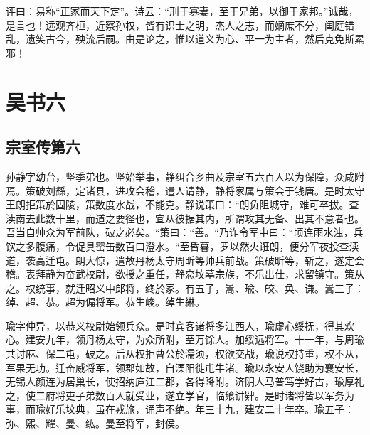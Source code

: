 \documentclass[12pt,UTF8]{ctexbook}
\begin{document}
评曰：易称“正家而天下定”。诗云：“刑于寡妻，至于兄弟，以御于家邦。”诚哉，是言也！远观齐桓，近察孙权，皆有识士之明，杰人之志，而嫡庶不分，闺庭错乱，遗笑古今，殃流后嗣。由是论之，惟以道义为心、平一为主者，然后克免斯累邪！

\part{吴书六}
\chapter{宗室传第六}

孙静字幼台，坚季弟也。坚始举事，静纠合乡曲及宗室五六百人以为保障，众咸附焉。策破刘繇，定诸县，进攻会稽，遣人请静，静将家属与策会于钱唐。是时太守王朗拒策於固陵，策数度水战，不能克。静说策曰：“朗负阻城守，难可卒拔。查渎南去此数十里，而道之要径也，宜从彼据其内，所谓攻其无备、出其不意者也。吾当自帅众为军前队，破之必矣。“策曰：“善。“乃诈令军中曰：“顷连雨水浊，兵饮之多腹痛，令促具罂缶数百口澄水。“至昏暮，罗以然火诳朗，便分军夜投查渎道，袭高迁屯。朗大惊，遣故丹杨太守周昕等帅兵前战。策破昕等，斩之，遂定会稽。表拜静为奋武校尉，欲授之重任，静恋坟墓宗族，不乐出仕，求留镇守。策从之。权统事，就迁昭义中郎将，终於家。有五子，暠、瑜、皎、奂、谦。暠三子：绰、超、恭。超为偏将军。恭生峻。绰生綝。

瑜字仲异，以恭义校尉始领兵众。是时宾客诸将多江西人，瑜虚心绥抚，得其欢心。建安九年，领丹杨太守，为众所附，至万馀人。加绥远将军。十一年，与周瑜共讨麻、保二屯，破之。后从权拒曹公於濡须，权欲交战，瑜说权持重，权不从，军果无功。迁奋威将军，领郡如故，自溧阳徙屯牛渚。瑜以永安人饶助为襄安长，无锡人颜连为居巢长，使招纳庐江二郡，各得降附。济阴人马普笃学好古，瑜厚礼之，使二府将吏子弟数百人就受业，遂立学官，临飨讲肄。是时诸将皆以军务为事，而瑜好乐坟典，虽在戎旅，诵声不绝。年三十九，建安二十年卒。瑜五子：弥、熙、耀、曼、纮。曼至将军，封侯。
\end{document}
